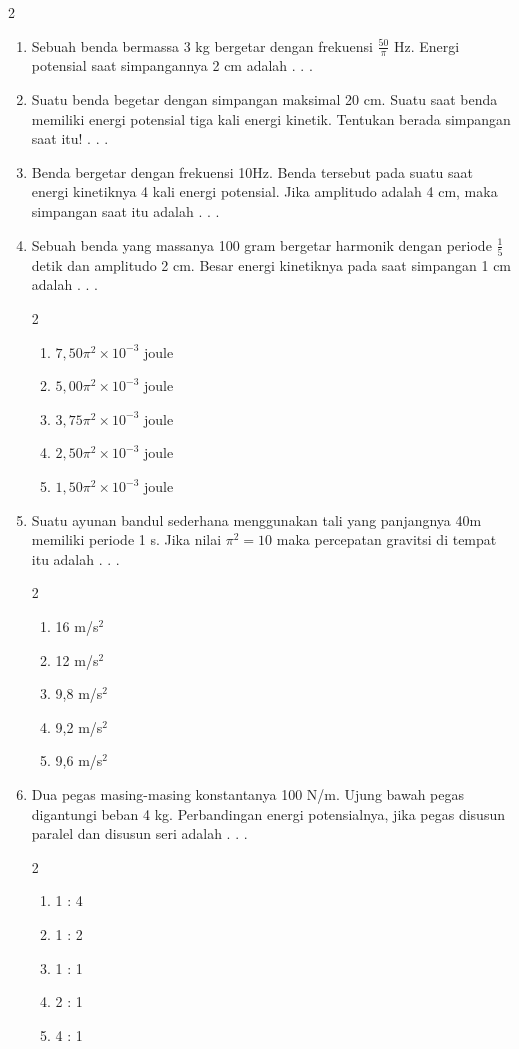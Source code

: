 \documentclass[10pt,a4paper]{extarticle}
\newcommand{\pilgani}[1]{                            \vspace{-0.3cm}\begin{multicols}{2}
 \begin{enumerate}[label=\Alph*., itemsep=0pt,topsep=0pt,leftmargin=*,align=Center]#1                     \end{enumerate}
 \phantom{ini cuma sapi, wedus, dan ayam}
 \end{multicols}}
\begin{document}
\begin{multicols*}{2}
\begin{enumerate}
\item Sebuah benda bermassa 3 kg bergetar dengan frekuensi $\frac{50}{\pi}$ Hz. Energi potensial saat simpangannya 2 cm adalah . . .  

\vspace{3cm}

\item Suatu benda begetar dengan simpangan maksimal 20 cm. Suatu saat benda memiliki energi potensial tiga kali energi kinetik. Tentukan berada simpangan saat itu! . . . 
\vspace{4cm}

\item Benda bergetar dengan frekuensi 10Hz. Benda tersebut pada suatu saat energi kinetiknya 4 kali energi potensial. Jika amplitudo adalah 4 cm, maka simpangan saat itu adalah . . . 
\vspace{4cm}

\item Sebuah benda yang massanya 100 gram bergetar harmonik dengan periode $\frac{1}{5}$ detik dan amplitudo 2 cm. Besar energi kinetiknya pada saat simpangan 1 cm adalah . . .
\pilgani{
   \item $7,50 \pi^2 \times 10^{-3}$ joule
   \item $5,00 \pi^2 \times 10^{-3}$ joule
   \item $3,75 \pi^2 \times 10^{-3}$ joule
   \item $2,50\pi^2 \times 10^{-3}$ joule
   \item $1,50 \pi^2 \times 10^{-3}$ joule
}
\vspace{3cm}
\item Suatu ayunan bandul sederhana menggunakan tali yang panjangnya 40m memiliki periode 1 s. Jika nilai $\pi^2=10$ maka percepatan gravitsi di tempat itu adalah . . .
\pilgani{
   \item 16 m/s$^2$
   \item 12 m/s$^2$
   \item 9,8 m/s$^2$
   \item 9,2 m/s$^2$
   \item 9,6 m/s$^2$}
\vspace{3cm}

\item Dua pegas masing-masing konstantanya 100 N/m. Ujung bawah pegas digantungi beban 4 kg. Perbandingan energi potensialnya, jika pegas disusun paralel dan disusun seri adalah . . .
\pilgani{
   \item 1 : 4
   \item 1 :  2
   \item 1 : 1
   \item 2 : 1
   \item 4 : 1
}
\vspace{3cm}


\end{enumerate}
\end{multicols*}
\end{document}
